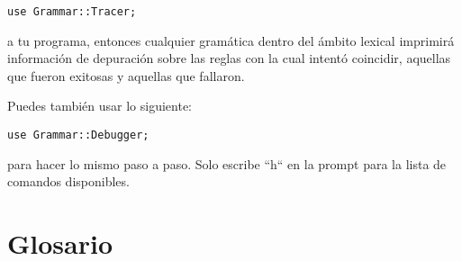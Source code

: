 \begin{verbatim}
use Grammar::Tracer;
\end{verbatim}

a tu programa, entonces cualquier gramática dentro del ámbito lexical
imprimirá información de depuración sobre las reglas con la cual
intentó coincidir, aquellas que fueron exitosas y aquellas que 
fallaron.

Puedes también usar lo siguiente:

\begin{verbatim}
use Grammar::Debugger;
\end{verbatim}

para hacer lo mismo paso a paso. Solo escribe ``h`` en la 
prompt para la lista de comandos disponibles.


\section{Glosario}

